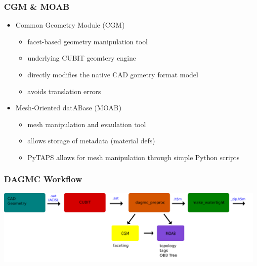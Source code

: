 \documentclass[14pt]{beamer}
\begin{document}
\begin{frame}
\frametitle{CGM \& MOAB}
\begin{itemize}
\item Common Geometry Module (CGM)
	\begin{itemize}
	\item facet-based geometry manipulation tool
	\item underlying CUBIT geomtery engine
	\item directly modifies the native CAD gometry format model
	\item avoids translation errors
	\end{itemize}
	\vfill
\item Mesh-Oriented datABase (MOAB)
	\begin{itemize}
	\item mesh manipulation and evaulation tool
	\item allows storage of metadata (material defs)
	\item PyTAPS allows for mesh manipulation through simple Python scripts
	\end{itemize}
\end{itemize}
\end{frame}


\begin{frame}
\frametitle{DAGMC Workflow}
\begin{center}
\includegraphics[scale=0.23, trim = 40 200 0 0]{DAGMC_Wrkflw4.png}
\end{center}
\end{frame}
\end{document}
